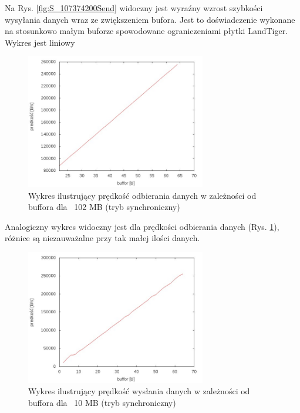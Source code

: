 \documentclass{BscUS}
\begin{document}
Na Rys. \ref{fig:S_107374200Send} widoczny jest wyraźny wzrost szybkości wysyłania danych wraz ze zwiększeniem bufora. Jest to doświadczenie wykonane na stosunkowo małym buforze spowodowane ograniczeniami płytki LandTiger. Wykres jest liniowy 
\begin{figure}[h]
{
\centering
\includegraphics[width=0.7\textwidth]{./img/S_107374200Receive}
\caption{Wykres ilustrujący prędkość odbierania danych w zależności od buffora dla ~102 MB (tryb synchroniczny)}
\label{fig:S_107374200Receive}
}
\end{figure}
\newline
Analogiczny wykres widoczny jest dla prędkości odbierania danych (Rys. \ref{fig:S_107374200Receive}), różnice są niezauważalne przy tak małej ilości danych.

\begin{figure}[H]
{
\centering
\includegraphics[width=0.7\textwidth]{./img/S_10737420Send}
\caption{Wykres ilustrujący prędkość wysłania danych w zależności od buffora dla ~10 MB (tryb synchroniczny)}
\label{fig:S_10737420Send}
}
\end{figure}
\end{document}
